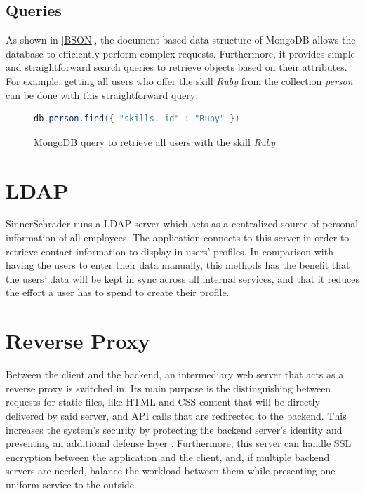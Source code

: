\newpage



\subsection{Queries}
As shown in \ref{BSON}, the document based data structure of MongoDB allows the database to efficiently perform complex requests. Furthermore, it provides simple and straightforward search queries to retrieve objects based on their attributes. For example, getting all users who offer the skill \textit{Ruby} from the collection \textit{person} can be done with this straightforward query:
\begin{figure}[h]
\begin{lstlisting}[language=Java]
db.person.find({ "skills._id" : "Ruby" })
\end{lstlisting}
\caption[Example Database Query]{MongoDB query to retrieve all users with the skill \textit{Ruby}}
\end{figure}

\section{LDAP}
SinnerSchrader runs a LDAP server which acts as a centralized source of personal information of all employees. The application connects to this server in order to retrieve contact information to display in users' profiles. In comparison with having the users to enter their data manually, this methods has the benefit that the users' data will be kept in sync across all internal services, and that it reduces the effort a user has to spend to create their profile.

\section{Reverse Proxy}
Between the client and the backend, an intermediary web server that acts as a reverse proxy is switched in. Its main purpose is the distinguishing between requests for static files, like HTML and CSS content that will be directly delivered by said server, and API calls that are redirected to the backend. This increases the system's security by protecting the backend server's identity and presenting an additional defense layer \cite{NGINX}. Furthermore, this server can handle SSL encryption between the application and the client, and, if multiple backend servers are needed, balance the workload between them while presenting one uniform service to the outside.

